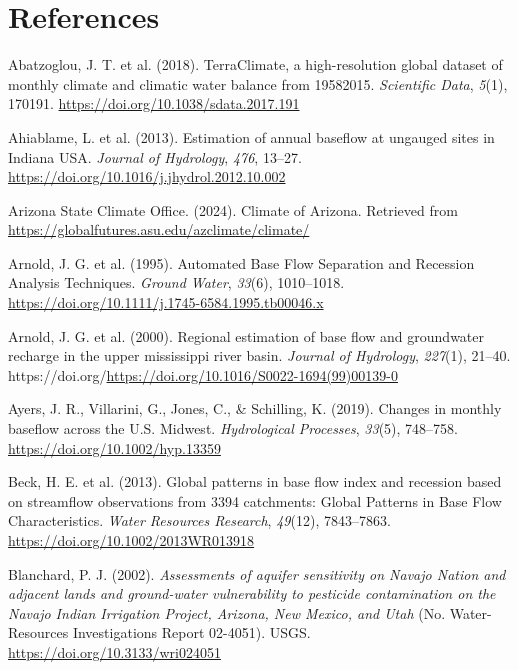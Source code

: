 \documentclass[
]{agujournal2019}
\newlength{\cslhangindent}
\newenvironment{CSLReferences}[2] %
 {\begin{list}{}{%
  \setlength{\itemindent}{0pt}
  \setlength{\leftmargin}{0pt}
  \setlength{\parsep}{0pt}
  \ifodd #1
   \setlength{\leftmargin}{\cslhangindent}
   \setlength{\itemindent}{-1\cslhangindent}
  \fi
  \setlength{\itemsep}{#2\baselineskip}}}
 {\end{list}}
\begin{document}
\section*{References}\label{references}

\label{refs}
\begin{CSLReferences}{1}{0}
Abatzoglou, J. T. et al. (2018). TerraClimate, a high-resolution global
dataset of monthly climate and climatic water balance from
1958{\textendash}2015. \emph{Scientific Data}, \emph{5}(1), 170191.
\url{https://doi.org/10.1038/sdata.2017.191}

Ahiablame, L. et al. (2013). Estimation of annual baseflow at ungauged
sites in Indiana USA. \emph{Journal of Hydrology}, \emph{476}, 13--27.
\url{https://doi.org/10.1016/j.jhydrol.2012.10.002}

Arizona State Climate Office. (2024). {Climate of Arizona}. Retrieved
from \url{https://globalfutures.asu.edu/azclimate/climate/}

Arnold, J. G. et al. (1995). Automated Base Flow Separation and
Recession Analysis Techniques. \emph{Ground Water}, \emph{33}(6),
1010--1018. \url{https://doi.org/10.1111/j.1745-6584.1995.tb00046.x}

Arnold, J. G. et al. (2000). Regional estimation of base flow and
groundwater recharge in the upper mississippi river basin. \emph{Journal
of Hydrology}, \emph{227}(1), 21--40.
https://doi.org/\url{https://doi.org/10.1016/S0022-1694(99)00139-0}

Ayers, J. R., Villarini, G., Jones, C., \& Schilling, K. (2019). Changes
in monthly baseflow across the U.S. Midwest. \emph{Hydrological
Processes}, \emph{33}(5), 748--758.
\url{https://doi.org/10.1002/hyp.13359}

Beck, H. E. et al. (2013). Global patterns in base flow index and
recession based on streamflow observations from 3394 catchments: Global
Patterns in Base Flow Characteristics. \emph{Water Resources Research},
\emph{49}(12), 7843--7863. \url{https://doi.org/10.1002/2013WR013918}

Blanchard, P. J. (2002). \emph{Assessments of aquifer sensitivity on
{Navajo Nation} and adjacent lands and ground-water vulnerability to
pesticide contamination on the {Navajo Indian Irrigation Project},
{Arizona}, {New Mexico}, and {Utah}} (No. Water-Resources Investigations
Report 02-4051). {USGS}. \url{https://doi.org/10.3133/wri024051}


\end{CSLReferences}
\end{document}
